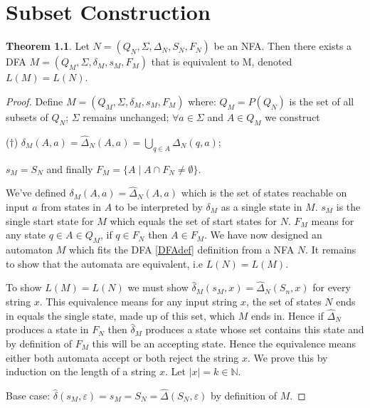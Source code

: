 \documentclass[a4paper,12pt]{report}
\theoremstyle{definition}
\newtheorem{theorem}{Theorem}[chapter]
\begin{document}
\chapter{Subset Construction}
\begin{theorem}
\label{thmSubConst}
Let $N=(Q_N,\Sigma, \Delta_N, S_N, F_N)$ be an NFA. Then there exists a DFA $M=(Q_M,\Sigma,\delta_M,s_M,F_M)$ that is equivalent to M, denoted $L(M)=L(N)$. 
\end{theorem}

\noindent[4, section 2.6, p.54]

\begin{proof}
Define $M=(Q_M,\Sigma,\delta_M,s_M,F_M)$ where: $Q_M = P(Q_N) $ is the set of all subsets of $Q_N$; $\Sigma$ remains unchanged; $\forall a\in\Sigma$ and $A\in Q_M$ we construct  

\noindent ($\dagger$) $\delta_M(A,a) = \hat{\Delta}_N(A,a) = \bigcup\limits_{q\in A}\Delta_N(q,a)$;

\noindent $s_M=S_N$ and  finally $F_M = \{ A\mid A \cap F_N \neq \emptyset\}$.

We've defined $\delta_M(A,a)=\hat{\Delta}_N(A,a)$ which is the set of states reachable on input $a$ from states in $A$ to be interpreted by  $\delta_M$ as a single state in $M$. $s_M$ is the single start state for $M$ which equals the set of start states for $N$. $F_M$ means for any state $q\in A \in Q_M$, if $q\in F_N$ then $A\in F_M$. We have now designed an automaton $M$ which fits the DFA  \ref{DFAdef} definition from a NFA $N$. It remains to show that the automata are equivalent, i.e $L(N)=L(M)$.

To show $L(M)=L(N)$ we must show $\hat{\delta}_M(s_M,x)=\hat{\Delta}_N(S_n,x)$ for every string $x$. This equivalence means for any input string $x$, the set of states $N$ ends in equals the single state, made up of this set, which $M$ ends in. Hence if $\hat{\Delta}_N$ produces a state in $F_N$ then $\hat{\delta}_M$ produces a state whose set contains this state and by definition of $F_M$ this will be an accepting state. Hence the equivalence means either both automata accept or both reject the string $x$. We prove this by induction on the length of a string $x$. Let $|x|= k \in\mathbb{N}$. 

Base case: $\hat{\delta}(s_M,\varepsilon)=s_M = S_N=\hat\Delta(S_N,\varepsilon)$ by definition of $M$.


\end{proof}
\end{document}
